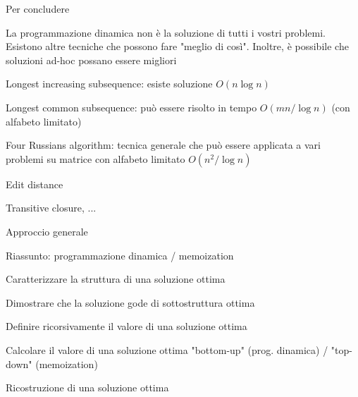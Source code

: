 \begin{frame}{Per concludere}

\vspace{-6pt}
\begin{myboxtitle}
La programmazione dinamica non è la soluzione di tutti i vostri problemi. Esistono altre tecniche che possono fare "meglio di così". Inoltre, è possibile che soluzioni ad-hoc possano essere migliori
\end{myboxtitle}

\begin{myboxtitle}[Esempi]
\BI
\item \alert{Longest increasing subsequence}: esiste soluzione $O(n \log n)$
\item \alert{Longest common subsequence}: può essere risolto in tempo $O(mn/\log n)$ (con alfabeto limitato)
\item \alert{Four Russians algorithm}: tecnica generale che può essere applicata a vari problemi su matrice con alfabeto limitato $O(n^2/\log n)$
\BI
\item Edit distance
\item Transitive closure, ...
\EI
\EI
\end{myboxtitle}

\end{frame}

\begin{frame}{Approccio generale}

\vspace{-6pt}

\end{frame}

\begin{frame}{Riassunto: programmazione dinamica / memoization}

\vspace{-6pt}
\begin{myboxtitle}[Fasi]
\BIL 
\item Caratterizzare la \alert{struttura} di una soluzione ottima
\item Dimostrare che la soluzione gode di \alert{sottostruttura ottima}
\item Definire ricorsivamente il \alert{valore} di una soluzione ottima
\item Calcolare il \alert{valore} di una soluzione ottima "bottom-up" (prog. dinamica) / "top-down" (memoization)
\item \alert{Ricostruzione} di una soluzione ottima 
\EIL
\end{myboxtitle}

\end{frame}




